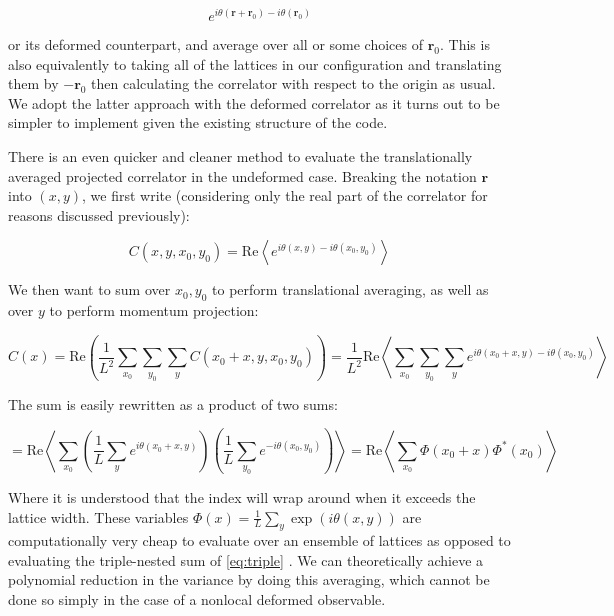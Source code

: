 \documentclass[12pt]{article}
\begin{document}
\begin{equation*}
	e^{i\theta(\mathbf{r}+\mathbf{r}_0)-i\theta(\mathbf{r}_0)}
\end{equation*}

or its deformed counterpart, and average over all or some choices of $\mathbf{r}_0$. This is also equivalently to taking all of the lattices in our configuration and translating them by $-\mathbf{r}_0$
then calculating the correlator with respect to the origin as usual. We adopt the latter approach with the deformed correlator as it turns out to be simpler to implement given
the existing structure of the code. 

There is an even quicker and cleaner method to evaluate the translationally averaged projected correlator in the undeformed case. Breaking the notation $\mathbf{r}$ into $(x, y)$, we first write
(considering only the real part of the correlator for reasons discussed previously):

\begin{equation*}
	C(x,y,x_0,y_0) = \mathrm{Re} \left\langle e^{i\theta(x,y) - i\theta(x_0,y_0)} \right\rangle
\end{equation*}

We then want to sum over $x_0,y_0$ to perform translational averaging, as well as over $y$ to perform momentum projection:

\begin{equation} \label{eq:triple}
	C(x) = \mathrm{Re} \left( \frac{1}{L^2} \sum_{x_0}\sum_{y_0}\sum_{y}C(x_0+x,y,x_0,y_0) \right) = \frac{1}{L^2} \mathrm{Re} \left\langle \sum_{x_0}\sum_{y_0}\sum_{y} e^{i\theta(x_0+x,y) - i\theta(x_0,y_0)} \right\rangle
\end{equation}

The sum is easily rewritten as a product of two sums:

\begin{equation}
	= \mathrm{Re} \left\langle \sum_{x_0} \left( \frac{1}{L}\sum_{y} e^{i\theta(x_0+x,y)} \right) \left( \frac{1}{L}\sum_{y_0} e^{-i\theta(x_0,y_0)} \right)  \right\rangle = \mathrm{Re} \left\langle \sum_{x_0} \Phi(x_0+x)\Phi^*(x_0) \right\rangle
\end{equation}

Where it is understood that the index will wrap around when it exceeds the lattice width. These variables $\Phi(x)=\frac{1}{L}\sum_{y}\exp(i\theta(x,y))$ are computationally very cheap to evaluate over an ensemble of lattices
as opposed to evaluating the triple-nested sum of \ref{eq:triple} .
We can theoretically achieve a polynomial reduction in the variance by doing this averaging, which cannot be done so simply in the case of a nonlocal deformed observable.
\end{document}
